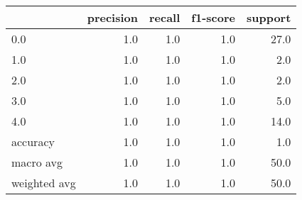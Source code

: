 \begin{tabular}{lrrrr}
\toprule
{} &  precision &  recall &  f1-score &  support \\
\midrule
0.0          &        1.0 &     1.0 &       1.0 &     27.0 \\
1.0          &        1.0 &     1.0 &       1.0 &      2.0 \\
2.0          &        1.0 &     1.0 &       1.0 &      2.0 \\
3.0          &        1.0 &     1.0 &       1.0 &      5.0 \\
4.0          &        1.0 &     1.0 &       1.0 &     14.0 \\
accuracy     &        1.0 &     1.0 &       1.0 &      1.0 \\
macro avg    &        1.0 &     1.0 &       1.0 &     50.0 \\
weighted avg &        1.0 &     1.0 &       1.0 &     50.0 \\
\bottomrule
\end{tabular}
